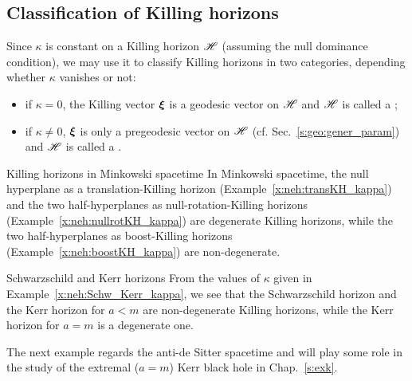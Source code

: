 \subsection{Classification of Killing horizons} \label{s:neh:classif_KH}

Since $\kappa$ is constant on a Killing horizon $\mathscr{H}$ (assuming the null dominance
condition), we may use it to classify Killing horizons in two
categories, depending whether $\kappa$ vanishes or not:
\begin{itemize}
\item if $\kappa = 0$, the Killing vector $\bm{\xi}$ is a geodesic vector on $\mathscr{H}$
and $\mathscr{H}$ is called a ;
\item if $\kappa \not=0$, $\bm{\xi}$ is only a pregeodesic vector on $\mathscr{H}$
(cf. Sec.~\ref{s:geo:gener_param})
and $\mathscr{H}$ is called a .
\end{itemize}

\begin{texample}{Killing horizons in Minkowski spacetime}{}
In Minkowski spacetime, the null hyperplane as a translation-Killing horizon
(Example~\ref{x:neh:transKH_kappa}) and the two half-hyperplanes as
null-rotation-Killing horizons (Example~\ref{x:neh:nullrotKH_kappa}) are
degenerate Killing horizons, while the two half-hyperplanes as
boost-Killing horizons (Example~\ref{x:neh:boostKH_kappa}) are non-degenerate.
\end{texample}

\begin{texample}{Schwarzschild and Kerr horizons}{}
From the values of $\kappa$ given in Example~\ref{x:neh:Schw_Kerr_kappa},
we see that the Schwarzschild horizon and the Kerr horizon for
$a<m$ are non-degenerate Killing horizons, while the Kerr horizon for
$a=m$ is a degenerate one.
\end{texample}

The next example regards the anti-de Sitter spacetime and will play some
role in the study of the extremal ($a=m$) Kerr black hole in Chap.~\ref{s:exk}.


